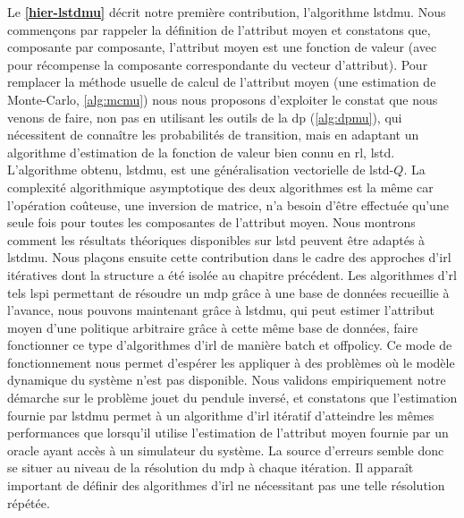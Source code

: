 \documentclass[frenchb,a4paper,justified,notoc]{tufte-book}
\begin{document}
Le \textbf{\autoref{hier-lstdmu}} décrit notre première contribution, l'algorithme \gls{lstdmu}. Nous commençons par rappeler la définition de l'attribut moyen et constatons que, composante par composante, l'attribut moyen est une fonction de valeur (avec pour récompense la composante correspondante du vecteur d'attribut). Pour remplacer la méthode usuelle de calcul de l'attribut moyen (une estimation de Monte-Carlo, \autoref{alg:mcmu}) nous nous proposons d'exploiter le constat que nous venons de faire, non pas en utilisant les outils de la \gls{dp} (\autoref{alg:dpmu}), qui nécessitent de connaître les probabilités de transition, mais en adaptant un algorithme d'estimation de la fonction de valeur bien connu en \gls{rl}, \gls{lstd}. L'algorithme obtenu, \gls{lstdmu}, est une généralisation vectorielle de \gls{lstd}-$Q$. La complexité algorithmique asymptotique des deux algorithmes est la même car l'opération coûteuse, une inversion de matrice, n'a besoin d'être effectuée qu'une seule fois pour toutes les composantes de l'attribut moyen. Nous montrons comment les résultats théoriques disponibles sur \gls{lstd} peuvent être adaptés à \gls{lstdmu}. Nous plaçons ensuite cette contribution dans le cadre des approches d'\gls{irl} itératives dont la structure a été isolée au chapitre précédent. Les algorithmes d'\gls{rl} tels \gls{lspi} permettant de résoudre un \gls{mdp} grâce à une base de données recueillie à l'avance, nous pouvons maintenant grâce à \gls{lstdmu}, qui peut estimer l'attribut moyen d'une politique arbitraire grâce à cette même base de données, faire fonctionner ce type d'algorithmes d'\gls{irl} de manière \gls{batch} et \gls{offpolicy}. Ce mode de fonctionnement nous permet d'espérer les appliquer à des problèmes où le modèle dynamique du système n'est pas disponible. Nous validons empiriquement notre démarche sur le problème jouet du pendule inversé, et constatons que l'estimation fournie par \gls{lstdmu} permet à un algorithme d'\gls{irl} itératif d'atteindre les mêmes performances que lorsqu'il utilise l'estimation de l'attribut moyen fournie par un oracle ayant accès à un simulateur du système. La source d'erreurs semble donc se situer au niveau de la résolution du \gls{mdp} à chaque itération. Il apparaît important de définir des algorithmes d'\gls{irl} ne nécessitant pas une telle résolution répétée.
\end{document}
